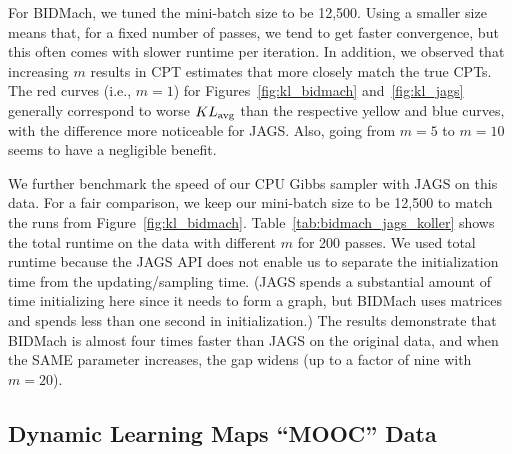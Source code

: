 \documentclass{article} %
\begin{document}
For BIDMach, we tuned the mini-batch size to be 12,500. Using a smaller size means that, for a fixed
number of passes, we tend to get faster convergence, but this often comes with slower runtime per
iteration. In addition, we observed that increasing $m$ results in CPT estimates that more closely
match the true CPTs. The red curves (i.e., $m=1$) for Figures~\ref{fig:kl_bidmach}
and~\ref{fig:kl_jags} generally correspond to worse $KL_{\rm avg}$ than the respective yellow and
blue curves, with the difference more noticeable for JAGS. Also, going from $m=5$ to $m=10$ seems to
have a negligible benefit.

We further benchmark the speed of our CPU Gibbs sampler with JAGS on this data. For a fair
comparison, we keep our mini-batch size to be 12,500 to match the runs from
Figure~\ref{fig:kl_bidmach}.  Table~\ref{tab:bidmach_jags_koller} shows the total runtime on the
data with different $m$ for 200 passes. We used total runtime because the JAGS API does not enable
us to separate the initialization time from the updating/sampling time. (JAGS spends a substantial
amount of time initializing here since it needs to form a graph, but BIDMach uses matrices and
spends less than one second in initialization.) The results demonstrate that BIDMach is almost four
times faster than JAGS on the original data, and when the SAME parameter increases, the gap widens
(up to a factor of nine with $m=20$).

\subsection{Dynamic Learning Maps ``MOOC'' Data}\label{ssec:mooc_data}
\end{document}
